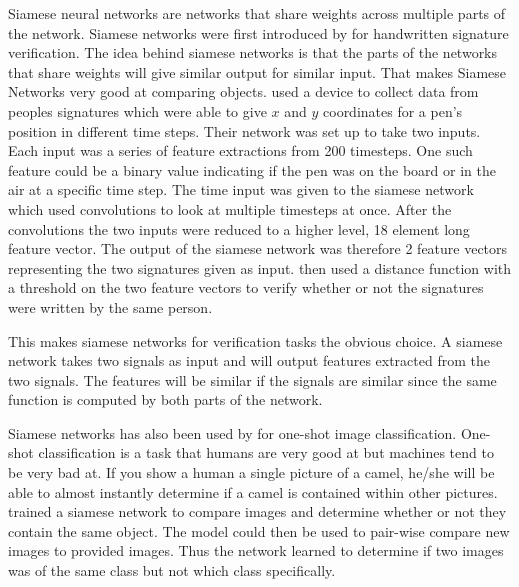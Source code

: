 Siamese neural networks are networks that share weights across multiple parts
of the network. Siamese networks were first introduced by \citet{NIPS1993_769}
for handwritten signature verification. The idea behind siamese networks is
that the parts of the networks that share weights will give similar output for
similar input. That makes Siamese Networks very good at comparing objects.
\citet{NIPS1993_769} used a device to collect data from peoples signatures which
were able to give $x$ and $y$ coordinates for a pen's position in different time
steps. Their network was set up to take two inputs. Each input was a series
of feature extractions from 200 timesteps. One such feature could be a binary
value indicating if the pen was on the board or in the air at a specific time
step. The time input was given to the siamese network which used convolutions to
look at multiple timesteps at once. After the convolutions the two inputs were
reduced to a higher level, 18 element long feature vector. The output of the
siamese network was therefore 2 feature vectors representing the two signatures
given as input. \citet{NIPS1993_769} then used a distance function with a
threshold on the two feature vectors to verify whether or not the signatures
were written by the same person.

This makes siamese networks for verification tasks the obvious choice. A siamese
network takes two signals as input and will output features extracted from the
two signals. The features will be similar if the signals are similar since the
same function is computed by both parts of the network.

Siamese networks has also been used by \citet{Koch2015SiameseNN} for one-shot
image classification. One-shot classification is a task that humans are very
good at but machines tend to be very bad at. If you show a human a single
picture of a camel, he/she will be able to almost instantly determine if a camel
is contained within other pictures. \citet{Koch2015SiameseNN} trained a siamese
network to compare images and determine whether or not they contain the same
object. The model could then be used to pair-wise compare new images to provided
images. Thus the network learned to determine if two images was of the same
class but not which class specifically.

